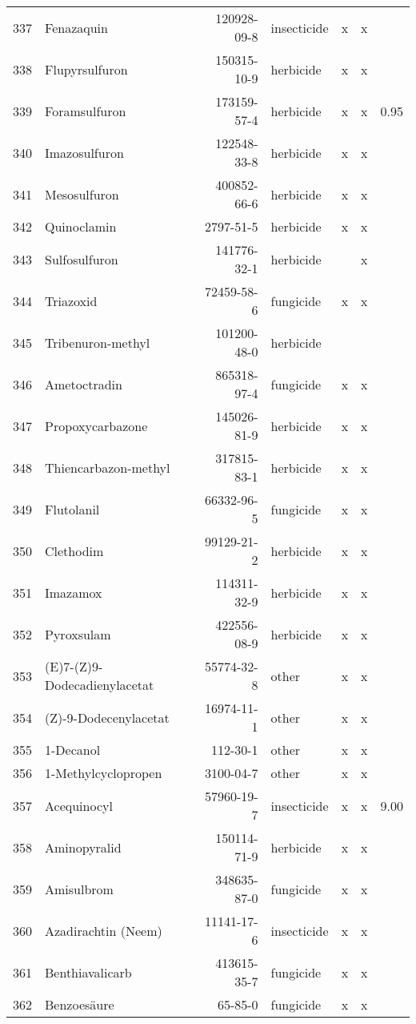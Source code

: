 \begin{longtable}{lp{3cm}rlp{0.5cm}p{0.5cm}p{1cm}}
  337 & Fenazaquin & 120928-09-8 & insecticide & x & x &  \\ 
  338 & Flupyrsulfuron & 150315-10-9 & herbicide & x & x &  \\ 
  339 & Foramsulfuron & 173159-57-4 & herbicide & x & x & 0.95 \\ 
  340 & Imazosulfuron & 122548-33-8 & herbicide & x & x &  \\ 
  341 & Mesosulfuron & 400852-66-6 & herbicide & x & x &  \\ 
  342 & Quinoclamin & 2797-51-5 & herbicide & x & x &  \\ 
  343 & Sulfosulfuron & 141776-32-1 & herbicide &  & x &  \\ 
  344 & Triazoxid & 72459-58-6 & fungicide & x & x &  \\ 
  345 & Tribenuron-methyl & 101200-48-0 & herbicide &  &  &  \\ 
  346 & Ametoctradin & 865318-97-4 & fungicide & x & x &  \\ 
  347 & Propoxycarbazone & 145026-81-9 & herbicide & x & x &  \\ 
  348 & Thiencarbazon-methyl & 317815-83-1 & herbicide & x & x &  \\ 
  349 & Flutolanil & 66332-96-5 & fungicide & x & x &  \\ 
  350 & Clethodim & 99129-21-2 & herbicide & x & x &  \\ 
  351 & Imazamox & 114311-32-9 & herbicide & x & x &  \\ 
  352 & Pyroxsulam & 422556-08-9 & herbicide & x & x &  \\ 
  353 & (E)7-(Z)9-Dodecadienylacetat & 55774-32-8 & other & x & x &  \\ 
  354 & (Z)-9-Dodecenylacetat & 16974-11-1 & other & x & x &  \\ 
  355 & 1-Decanol & 112-30-1 & other & x & x &  \\ 
  356 & 1-Methylcyclopropen & 3100-04-7 & other & x & x &  \\ 
  357 & Acequinocyl & 57960-19-7 & insecticide & x & x & 9.00 \\ 
  358 & Aminopyralid & 150114-71-9 & herbicide & x & x &  \\ 
  359 & Amisulbrom & 348635-87-0 & fungicide & x & x &  \\ 
  360 & Azadirachtin (Neem) & 11141-17-6 & insecticide & x & x &  \\ 
  361 & Benthiavalicarb & 413615-35-7 & fungicide & x & x &  \\ 
  362 & Benzoesäure & 65-85-0 & fungicide & x & x &  \\ 

\end{longtable}
